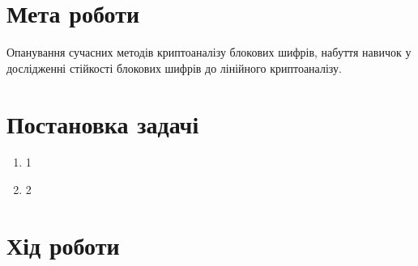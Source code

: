 \documentclass[12pt,a4paper]{article}
\begin{document}
\section{Мета роботи}

Опанування сучасних методів криптоаналізу блокових шифрів, набуття навичок у
дослідженні стійкості блокових шифрів до лінійного криптоаналізу.

\section{Постановка задачі}

\begin{enumerate}
\item 1 
\item 2
\end{enumerate}


\section{Хід роботи}
\end{document}
